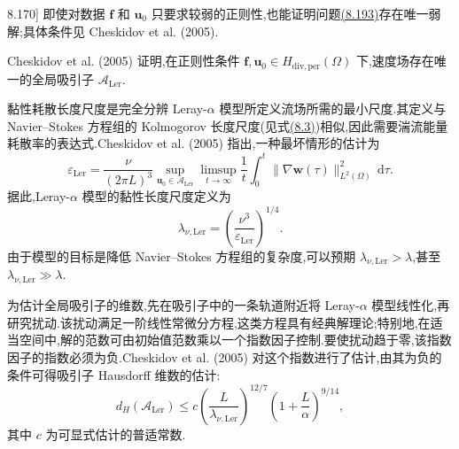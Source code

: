 \begin{note}[关于定理\hyperref[thm:leray-alpha-periodic-existence-uniqueness]{8.170}]
\label{note:leray-alpha-periodic-existence-uniqueness}
即使对数据 $\bm{f}$ 和 $\bm{u}_0$ 只要求较弱的正则性,也能证明问题\hyperref[eq:leray-alpha-periodic-problem]{(8.193)}存在唯一弱解;具体条件见 Cheskidov et al. (2005).
\end{note}

\begin{note}[吸引子的存在]
\label{note:leray-alpha-attractor-existence}
Cheskidov et al. (2005) 证明,在正则性条件 $\bm{f},\bm{u}_0\in H_{\mathrm{div,per}}(\Omega)$ 下,速度场存在唯一的全局吸引子 $\mathcal{A}_{\mathrm{Ler}}$.
\end{note}

\begin{note}[黏性耗散长度尺度的定义]
\label{note:leray-alpha-dissipation-length}
黏性耗散长度尺度是完全分辨 Leray-$\alpha$ 模型所定义流场所需的最小尺度.其定义与 Navier--Stokes 方程组的 Kolmogorov 长度尺度(见式\hyperref[eq:kolmogorov-scales]{(8.3)})相似,因此需要湍流能量耗散率的表达式.Cheskidov et al. (2005) 指出,一种最坏情形的估计为
\[
 \varepsilon_{\mathrm{Ler}}
 =\frac{\nu}{(2\pi L)^3}
  \sup_{\bm{u}_0\in\mathcal{A}_{\mathrm{Ler}}}
  \limsup_{t\to\infty}\frac{1}{t}
  \int_0^t\|\nabla\bm{w}(\tau)\|_{L^2(\Omega)}^2\,\mathrm{d}\tau.
\]
据此,Leray-$\alpha$ 模型的黏性长度尺度定义为
\[
 \lambda_{\nu,\mathrm{Ler}}
 =\left(\frac{\nu^3}{\varepsilon_{\mathrm{Ler}}}\right)^{1/4}.
\]
由于模型的目标是降低 Navier--Stokes 方程组的复杂度,可以预期
$\lambda_{\nu,\mathrm{Ler}}>\lambda$,甚至
$\lambda_{\nu,\mathrm{Ler}}\gg\lambda$.
\end{note}

\begin{note}[吸引子的维数]
\label{note:leray-alpha-attractor-dimension}
为估计全局吸引子的维数,先在吸引子中的一条轨道附近将 Leray-$\alpha$ 模型线性化,再研究扰动.该扰动满足一阶线性常微分方程,这类方程具有经典解理论;特别地,在适当空间中,解的范数可由初始值范数乘以一个指数因子控制.要使扰动趋于零,该指数因子的指数必须为负.Cheskidov et al. (2005) 对这个指数进行了估计,由其为负的条件可得吸引子 Hausdorff 维数的估计:
\begin{equation}\label{eq:leray-alpha-attractor-dimension}
 d_H(\mathcal{A}_{\mathrm{Ler}})
 \le c\left(\frac{L}{\lambda_{\nu,\mathrm{Ler}}}\right)^{12/7}
      \left(1+\frac{L}{\alpha}\right)^{9/14},
\end{equation}
其中 $c$ 为可显式估计的普适常数.
\end{note}

